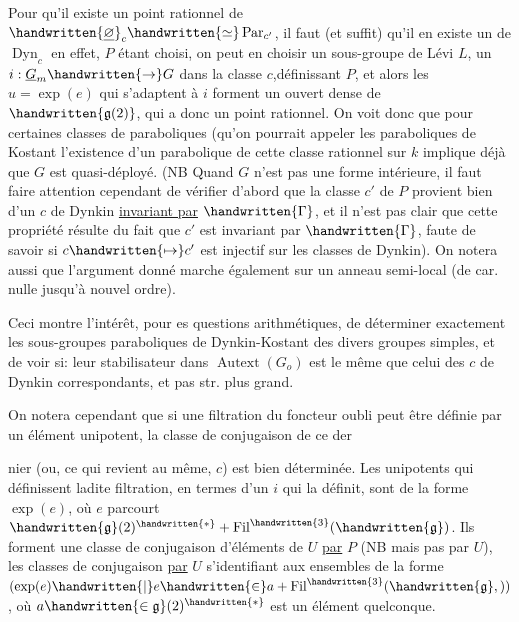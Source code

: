 Pour qu'il existe un point rationnel de  $\handwritten{\underline{\varnothing}}_c\handwritten{\simeq}\operatorname{Par}_{c'}$, il faut (et suffit) qu'il en existe un de $\operatorname{Dyn}_c$ \handwritten{:} en effet, $P$ étant choisi,  on peut en choisir un  sous-groupe de Lévi $L$, un $i:\underline{G}_m\handwritten{\to}G$ dans la classe $c$,définissant $P$, et alors les $u=\exp(e)$ qui  s'adaptent à $i$ forment un ouvert dense de $\handwritten{\mathfrak{g}(2)}$, qui  a donc un point rationnel. On voit donc que pour certaines classes de paraboliques (qu'on pourrait appeler les paraboliques de Kostant\unsure{)} l'existence d'un parabolique de cette classe rationnel sur $k$ implique déjà que $G$ est quasi-déployé. (NB Quand $G$ n'est pas une forme intérieure, il faut faire attention cependant de vérifier d'abord que la classe $c'$ de $P$ provient bien d'un $c$ de Dynkin \uline{invariant par} $\handwritten{\Gamma}$, et il n'est pas clair que cette propriété résulte du fait que $c'$ est invariant par $\handwritten{\Gamma}$, faute de savoir si $c\handwritten{\mapsto}c'$ est injectif sur les classes de Dynkin). \handwritten{(}On notera aussi que l'argument donné marche également sur un anneau semi-local (de car. nulle jusqu'à nouvel ordre).\handwritten{)}

Ceci montre l'intérêt, pour es questions arithmétiques, de déterminer exactement les sous-groupes parab\handwritten{\unsure{-}}oliques de Dynkin-Kostant des divers groupes simples, et de voir si: leur stabilisateur dans $\operatorname{Autext}(G_o)$ est le même que celui des $c$ de Dynkin correspondants, et pas str. plus grand.

On notera cependant que si une filtration du foncteur  oubli peut être définie par un élément unipotent, la classe de conjugaison de ce der%

nier (ou, ce qui revient au même, $c$) est bien déterminée. Les unipotents qui définissent ladite filtration, en termes d'un $i$ qui la définit, sont  de la forme $\exp(e)$, où $e$ parcourt $\handwritten{\mathfrak{g}}(2)^{\handwritten{*}}+\operatorname{Fil}^{\handwritten{3}}(\handwritten{\mathfrak{g}})$. Ils forment une classe de conjugaison d'éléments de $U$ \uline{par} $P$ (NB mais pas par $U$), les classes de conjugaison \uline{par} $U$ s'identifiant aux ensembles de la forme $(\exp(e)\handwritten{\mid}e\handwritten{\in}a+\operatorname{Fil}^{\handwritten{3}}(\handwritten{\mathfrak{g}},))$, où $a\handwritten{\in\mathfrak{g}}(2)^{\handwritten{*}}$ est un élément quelconque.

